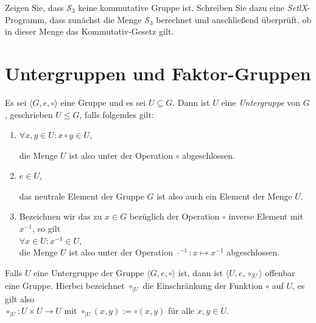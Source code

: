 \exercise
Zeigen Sie, dass $\mathcal{S}_3$ keine kommutative Gruppe ist.  Schreiben Sie dazu eine \textsl{SetlX}-Programm,
dass zunächst die Menge $\mathcal{S}_3$ berechnet und anschließend überprüft, ob in dieser Menge das
Kommutativ-Gesetz gilt.
\exend

\section{Untergruppen und Faktor-Gruppen}
\begin{Definition}[Untergruppe]
  Es sei $\langle G, e, \circ \rangle$ eine Gruppe und es sei $U \subseteq G$.  Dann ist $U$ eine 
  \emph{Untergruppe} von $G$, geschrieben $U \leq G$, falls folgendes gilt:
  \begin{enumerate}
  \item $\forall x, y \in U: x \circ y \in U$,

        die Menge $U$ ist also unter der Operation $\circ$ abgeschlossen.
  \item $e \in U$,

        das neutrale Element der Gruppe $G$ ist also auch ein Element der Menge $U$.
  \item Bezeichnen wir das zu $x \in G$ bezüglich der Operation $\circ$ inverse Element mit $x^{-1}$, 
        so gilt
        \\[0.2cm]
        \hspace*{1.3cm}
        $\forall x \in U: x^{-1} \in U$,
        \\[0.2cm]
        die Menge $U$ ist also unter der Operation $\cdot^{-1}: x \mapsto x^{-1}$ abgeschlossen.
  \end{enumerate}
\eox
\end{Definition}

\remark
Falls $U$ eine Untergruppe der Gruppe $\langle G, e, \circ \rangle$ ist, dann ist 
$\langle U, e, \circ_{|U} \rangle$
offenbar eine Gruppe.  Hierbei bezeichnet $\circ_{|U}$ die Einschränkung der Funktion $\circ$ auf $U$, es
gilt also
\\[0.2cm]
\hspace*{1.3cm}
$\circ_{|U}: U \times U \rightarrow U$ \quad mit $\circ_{|U}(x,y) := \circ(x,y)$ für alle $x,y \in U$.
\eox

